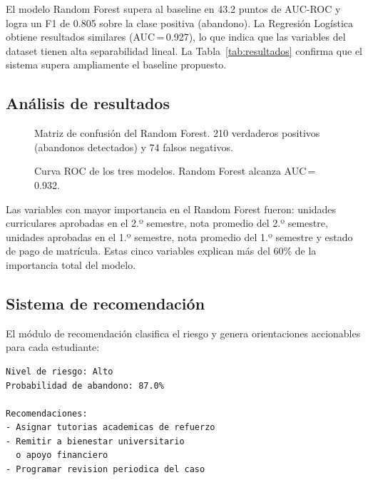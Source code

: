 \documentclass[10pt,twocolumn]{article}
\begin{document}
El modelo Random Forest supera al baseline en 43.2 puntos de AUC-ROC y
logra un F1 de 0.805 sobre la clase positiva (abandono). La Regresión
Logística obtiene resultados similares (AUC\,=\,0.927), lo que indica
que las variables del dataset tienen alta separabilidad lineal.
La Tabla~\ref{tab:resultados} confirma que el sistema supera ampliamente
el baseline propuesto.

\subsection{Análisis de resultados}

\begin{figure}[H]
  \centering
  \fbox{\rule{0pt}{2.8cm}\rule{\columnwidth-2\fboxsep}{0pt}}
  \caption{Matriz de confusión del Random Forest. 210 verdaderos positivos
           (abandonos detectados) y 74 falsos negativos.}
  \label{fig:cm}
\end{figure}

\begin{figure}[H]
  \centering
  \fbox{\rule{0pt}{2.5cm}\rule{\columnwidth-2\fboxsep}{0pt}}
  \caption{Curva ROC de los tres modelos. Random Forest alcanza
           AUC\,=\,0.932.}
  \label{fig:roc}
\end{figure}

Las variables con mayor importancia en el Random Forest fueron:
unidades curriculares aprobadas en el 2.º semestre, nota promedio del
2.º semestre, unidades aprobadas en el 1.º semestre, nota promedio del
1.º semestre y estado de pago de matrícula. Estas cinco variables
explican más del 60\% de la importancia total del modelo.

\subsection{Sistema de recomendación}

El módulo de recomendación clasifica el riesgo y genera orientaciones
accionables para cada estudiante:

\begin{lstlisting}[caption={Ejemplo de output del sistema para un
estudiante de alto riesgo}]
Nivel de riesgo: Alto
Probabilidad de abandono: 87.0%

Recomendaciones:
- Asignar tutorias academicas de refuerzo
- Remitir a bienestar universitario
  o apoyo financiero
- Programar revision periodica del caso
\end{lstlisting}

\end{document}
